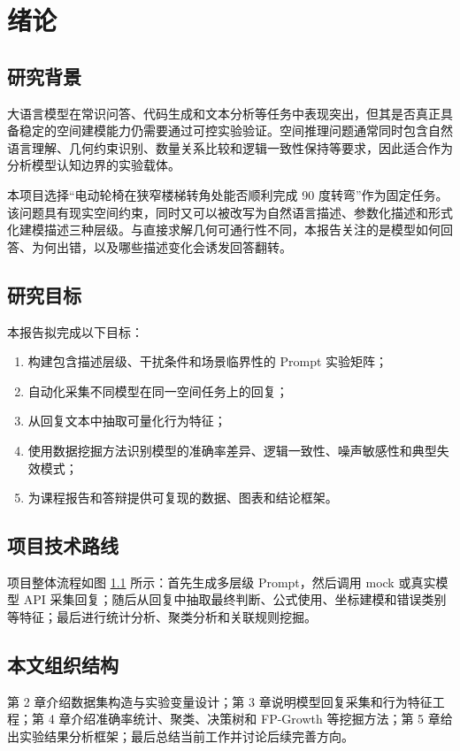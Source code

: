 
\chapter{绪论}

\section{研究背景}

大语言模型在常识问答、代码生成和文本分析等任务中表现突出，但其是否真正具备稳定的空间建模能力仍需要通过可控实验验证。空间推理问题通常同时包含自然语言理解、几何约束识别、数量关系比较和逻辑一致性保持等要求，因此适合作为分析模型认知边界的实验载体。

本项目选择“电动轮椅在狭窄楼梯转角处能否顺利完成 90 度转弯”作为固定任务。该问题具有现实空间约束，同时又可以被改写为自然语言描述、参数化描述和形式化建模描述三种层级。与直接求解几何可通行性不同，本报告关注的是模型如何回答、为何出错，以及哪些描述变化会诱发回答翻转。

\section{研究目标}

本报告拟完成以下目标：

\begin{enumerate}
    \item 构建包含描述层级、干扰条件和场景临界性的 Prompt 实验矩阵；
    \item 自动化采集不同模型在同一空间任务上的回复；
    \item 从回复文本中抽取可量化行为特征；
    \item 使用数据挖掘方法识别模型的准确率差异、逻辑一致性、噪声敏感性和典型失效模式；
    \item 为课程报告和答辩提供可复现的数据、图表和结论框架。
\end{enumerate}

\section{项目技术路线}

项目整体流程如图 \ref{fig:pipeline} 所示：首先生成多层级 Prompt，然后调用 mock 或真实模型 API 采集回复；随后从回复中抽取最终判断、公式使用、坐标建模和错误类别等特征；最后进行统计分析、聚类分析和关联规则挖掘。

\begin{figure}[htbp]
    \centering
    \label{fig:pipeline}
\end{figure}

\section{本文组织结构}

第 2 章介绍数据集构造与实验变量设计；第 3 章说明模型回复采集和行为特征工程；第 4 章介绍准确率统计、聚类、决策树和 FP-Growth 等挖掘方法；第 5 章给出实验结果分析框架；最后总结当前工作并讨论后续完善方向。
